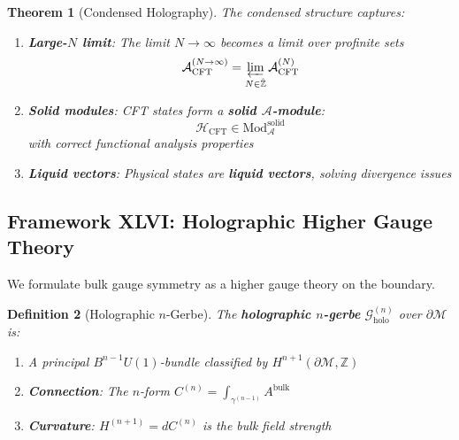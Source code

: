 \documentclass[12pt,a4paper]{article}
\newtheorem{theorem}{Theorem}[section]
\newtheorem{definition}[theorem]{Definition}
\begin{document}
\begin{theorem}[Condensed Holography]\label{thm:condensed-holo}
The condensed structure captures:
\begin{enumerate}
    \item \textbf{Large-$N$ limit}: The limit $N \to \infty$ becomes a limit over profinite sets
    \begin{equation}
    \mathcal{A}_{\text{CFT}}^{(N \to \infty)} = \varprojlim_{N \in \hat{\mathbb{Z}}} \mathcal{A}_{\text{CFT}}^{(N)}
    \end{equation}
    
    \item \textbf{Solid modules}: CFT states form a \textbf{solid $\mathcal{A}$-module}:
    \begin{equation}
    \mathcal{H}_{\text{CFT}} \in \text{Mod}_{\mathcal{A}}^{\text{solid}}
    \end{equation}
    with correct functional analysis properties
    
    \item \textbf{Liquid vectors}: Physical states are \textbf{liquid vectors}, solving divergence issues
\end{enumerate}
\end{theorem}

\subsection{Framework XLVI: Holographic Higher Gauge Theory}

We formulate bulk gauge symmetry as a higher gauge theory on the boundary.

\begin{definition}[Holographic $n$-Gerbe]\label{def:holo-gerbe}
The \textbf{holographic $n$-gerbe} $\mathcal{G}^{(n)}_{\text{holo}}$ over $\partial\mathcal{M}$ is:
\begin{enumerate}
    \item A principal $B^{n-1}U(1)$-bundle classified by $H^{n+1}(\partial\mathcal{M}, \mathbb{Z})$
    \item \textbf{Connection}: The $n$-form $C^{(n)} = \int_{\gamma^{(n-1)}} A^{\text{bulk}}$
    \item \textbf{Curvature}: $H^{(n+1)} = dC^{(n)}$ is the bulk field strength
\end{enumerate}
\end{definition}
\end{document}
